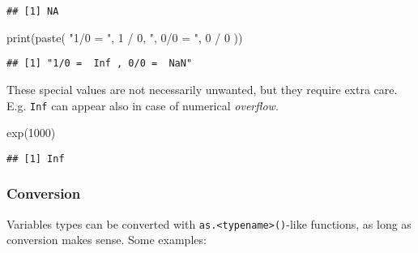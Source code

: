 \documentclass[
  oneside]{book}
\newenvironment{Shaded}{\begin{snugshade}}{\end{snugshade}}
\newcommand{\DecValTok}[1]{\textcolor[rgb]{0.00,0.00,0.81}{#1}}
\newcommand{\FunctionTok}[1]{\textcolor[rgb]{0.00,0.00,0.00}{#1}}
\newcommand{\NormalTok}[1]{#1}
\newcommand{\SpecialCharTok}[1]{\textcolor[rgb]{0.00,0.00,0.00}{#1}}
\newcommand{\StringTok}[1]{\textcolor[rgb]{0.31,0.60,0.02}{#1}}
\begin{document}
\begin{verbatim}
## [1] NA
\end{verbatim}

\begin{Shaded}
\begin{Highlighting}[]
\FunctionTok{print}\NormalTok{(}\FunctionTok{paste}\NormalTok{(}
  \StringTok{"1/0 = "}\NormalTok{, }\DecValTok{1} \SpecialCharTok{/} \DecValTok{0}\NormalTok{,}
  \StringTok{", 0/0 = "}\NormalTok{, }\DecValTok{0} \SpecialCharTok{/} \DecValTok{0}
\NormalTok{))}
\end{Highlighting}
\end{Shaded}

\begin{verbatim}
## [1] "1/0 =  Inf , 0/0 =  NaN"
\end{verbatim}

These special values are not necessarily unwanted, but they require
extra care. E.g. \texttt{Inf} can appear also in case of numerical \emph{overflow}.

\begin{Shaded}
\begin{Highlighting}[]
\FunctionTok{exp}\NormalTok{(}\DecValTok{1000}\NormalTok{)}
\end{Highlighting}
\end{Shaded}

\begin{verbatim}
## [1] Inf
\end{verbatim}

\hypertarget{conversion}{%
\subsubsection{Conversion}\label{conversion}}

Variables types can be converted with \texttt{as.\textless{}typename\textgreater{}()}-like functions, as long
as conversion makes sense. Some examples:
\end{document}
